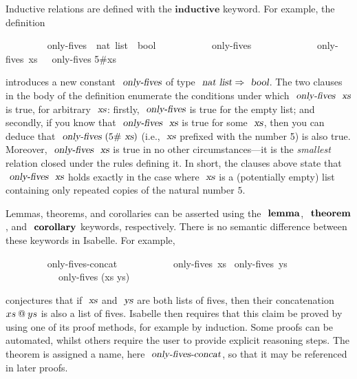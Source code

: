 Inductive relations are defined with the $\mathbf{inductive}$ keyword.
For example, the definition
\vspace{0.25em}
\begin{isabellebody}
\ \ \ \ \ \ \ \  only-fives\ {\isacharcolon}{\isacharcolon}\ {\isachardoublequoteopen}nat\ list\ {\isasymRightarrow}\ bool{\isachardoublequoteclose}\ \isanewline
\ \ \ \ \ \ \ \ \ \ {\isachardoublequoteopen}only-fives\ {\isacharbrackleft}{\isacharbrackright}{\isachardoublequoteclose}\ {\isacharbar}\isanewline
\ \ \ \ \ \ \ \ \ \ {\isachardoublequoteopen}{\isasymlbrakk}\ only-fives\ xs\ {\isasymrbrakk}\ {\isasymLongrightarrow}\ only-fives {\isacharparenleft}5\#xs{\isacharparenright}{\isachardoublequoteclose}
\end{isabellebody}
\vspace{0.25em}
\noindent
introduces a new constant $\isa{only-fives}$ of type $\isa{nat list} \Rightarrow \isa{bool}$.
The two clauses in the body of the definition enumerate the conditions under which $\isa{only-fives}\ \isa{xs}$ is true, for arbitrary $\isa{xs}$: firstly, $\isa{only-fives}$ is true for the empty list; and secondly, if you know that $\isa{only-fives}\ \isa{xs}$ is true for some $\isa{xs}$, then you can deduce that $\isa{only-fives}\ (5\#\isa{xs})$ (i.e., $\isa{xs}$ prefixed with the number 5) is also true.
Moreover, $\isa{only-fives}\ \isa{xs}$ is true in no other circumstances---it is the \emph{smallest} relation closed under the rules defining it.
In short, the clauses above state that $\isa{only-fives}\ \isa{xs}$ holds exactly in the case where $\isa{xs}$ is a (potentially empty) list containing only repeated copies of the natural number $5$.

Lemmas, theorems, and corollaries can be asserted using the $\isacommand{lemma}$, $\isacommand{theorem}$, and $\isacommand{corollary}$ keywords, respectively.
There is no semantic difference between these keywords in Isabelle.
For example,
\vspace{0.25em}
\begin{isabellebody}
\ \ \ \ \ \ \ \  only-fives-concat{\isacharcolon}\isanewline
\ \ \ \ \ \ \ \ \ \ \ only-fives\ xs \ only-fives\ ys \isanewline
\ \ \ \ \ \ \ \ \ \ \ only-fives (xs \isacharat ys)
\end{isabellebody}
\vspace{0.25em}
\noindent
conjectures that if $\isa{xs}$ and $\isa{ys}$ are both lists of fives, then their concatenation $xs \mathbin{\emph{$@$}} ys$ is also a list of fives.
Isabelle then requires that this claim be proved by using one of its proof methods, for example by induction.
Some proofs can be automated, whilst others require the user to provide explicit reasoning steps.
The theorem is assigned a name, here $\isa{only-fives-concat}$, so that it may be referenced in later proofs.

